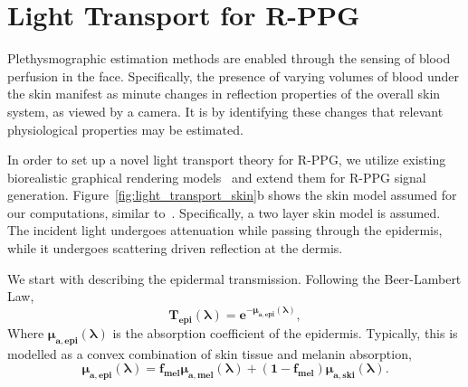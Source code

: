 \section{Light Transport for R-PPG}


Plethysmographic estimation methods are enabled through the sensing of blood perfusion in the face. Specifically, the presence of varying volumes of blood under the skin manifest as minute changes in reflection properties of the overall skin system, as viewed by a camera. It is by identifying these changes that relevant physiological properties may be estimated. 

In order to set up a novel light transport theory for R-PPG, we utilize existing biorealistic graphical rendering models~\cite{krishnaswamy_biophysically_2004,igarashi_appearance_2007} and extend them for R-PPG signal generation. Figure~\ref{fig:light_transport_skin}b shows the skin model assumed for our computations, similar to~\cite{alotaibi_biophysical_2017}. Specifically, a two layer skin model is assumed. The incident light undergoes attenuation while passing through the epidermis, while it undergoes scattering driven reflection at the dermis. 

We start with describing the epidermal transmission. Following the Beer-Lambert Law, 
\begin{equation} \label{eqn:T_epidermis}
    \mathbf{T_{epi}(\boldsymbol{\lambda})=e^{-\boldsymbol\mu_{a,epi}(\boldsymbol\lambda)}},
\end{equation}
Where $\mathbf{\boldsymbol\mu_{a,epi}(\boldsymbol\lambda)}$ is the absorption coefficient of the epidermis. Typically, this is modelled as a convex combination of skin tissue and melanin absorption,
\begin{equation} \label{eqn:mu_epidermis}
    \mathbf{\boldsymbol\mu_{a,epi}(\boldsymbol\lambda)=f_{mel}\boldsymbol\mu_{a,mel}(\boldsymbol\lambda)+(1-f_{mel})\boldsymbol\mu_{a,ski}(\boldsymbol\lambda)}.
\end{equation}

